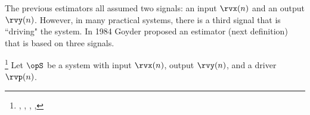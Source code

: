 The previous estimators all assumed two signals: an input $\rvx(n)$ and an output $\rvy(n)$.
However, in many practical systems, there is a third signal that is ``driving" the system.
In 1984 Goyder proposed an estimator (next definition) that is based on three signals.
\begin{definition}
\footnote{
  ,
  ,
  ,
  ,
  }
\label{def:Hc}
Let $\opS$ be a system with input $\rvx(n)$, output $\rvy(n)$, and a driver $\rvp(n)$.
\end{definition}

